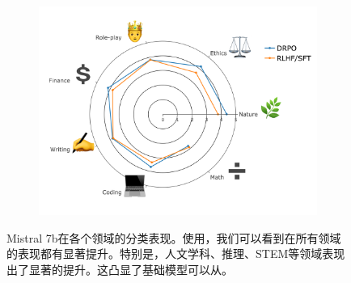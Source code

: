 \begin{figure}[h]
\begin{subfigure}[b]{.5\textwidth}
  \centering
  \includegraphics[width=0.95\linewidth]{images/mistral_2.png}
  \label{fig:cat_mistral_2}
\end{subfigure}
\caption{Mistral 7b在各个领域的分类表现。使用\ours，我们可以看到在所有领域的表现都有显著提升。特别是，人文学科、推理、STEM等领域表现出了显著的提升。这凸显了基础模型可以从。}
\label{fig:categorized_performance_mistral}
\end{figure}

\newpage
